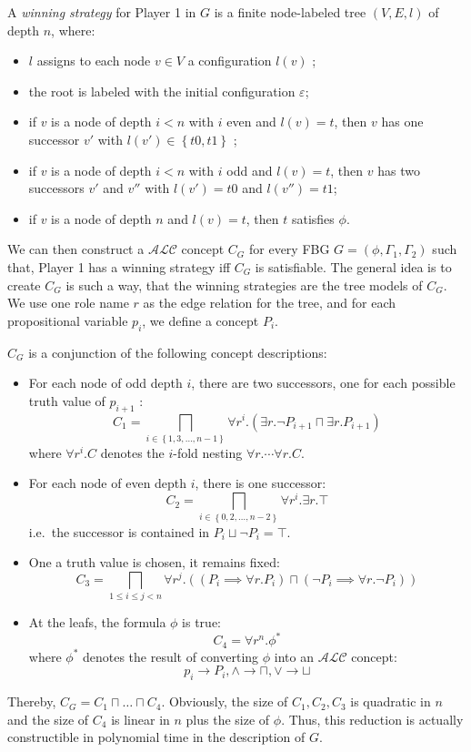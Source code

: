 A \textit{winning strategy} for Player 1 in $G$ is a finite node-labeled tree $\left( V, E ,l \right)$ of depth $n$, where:
 \begin{itemize}
	 \item $l$ assigns to each node $v \in V$ a configuration $l(v)$ ;
	 \item the root is labeled with the initial configuration $\varepsilon$;
	 \item if $v$ is a node of depth $i < n$ with $i$ even and $l(v) = t$,
		 then $v$ has one successor $v'$ with $l(v')  \in \left\{ t0, t1 \right\}$ ;
	 \item if $v$ is a node of depth $i < n$ with $i$ odd and $l(v) = t$,
		 then $v$ has two successors $v'$ and $v''$ with $l(v') = t0$ and $l(v'') = t1$;
	 \item if $v$ is a node of depth $n$ and $l(v) = t$, then $t$ satisfies $\phi$.
\end{itemize}

We can then construct a $\mathcal{ALC}$ concept $C_G$ for every FBG $G = \left( \phi, \Gamma_1, \Gamma_2 \right)$ such that,
Player 1 has a winning strategy iff $C_G$ is satisfiable.
The general idea is to create $C_G$ is such a way, that the winning strategies are the tree models of $C_G$.
We use one role name $r$ as the edge relation for the tree, and for each propositional variable $p_i$, we define a concept $P_i$.

$C_G$ is a conjunction of the following concept descriptions:
\begin{itemize}
	\item For each node of odd depth $i$, there are two successors, one for each possible truth value of $p_{i+1}$ :
		\[
			C_1 = \bigsqcap_{i \in \left\{ 1,3, \ldots, n-1 \right\}} \forall r^i.(\exists r. \neg P_{i+1} \sqcap \exists r.P_{i+1})
		\]
		where $\forall r^i.C$ denotes the $i$-fold nesting $\forall r. \cdots \forall r.C$.
	\item For each node of even depth $i$, there is one successor:
		\[
			C_2 = \bigsqcap_{i \in \left\{ 0, 2, \ldots, n-2 \right\}} \forall r^i.\exists r. \top
		\]
		i.e.\ the successor is contained in $P_i \sqcup \neg P_i = \top$.
	\item One a truth value is chosen, it remains fixed:
		\[
			C_3 = \bigsqcap_{1 \leq i \leq j <n} \forall r^j. \left( (P_i \implies \forall r.P_i) \sqcap (\neg P_i \implies \forall r. \neg P_i) \right)
		\]
	\item At the leafs, the formula $\phi$ is true:
		\[
			C_4 = \forall r^n. \phi^*
		\]
		where $\phi^*$ denotes the result of converting $\phi$ into an $\mathcal{ALC}$ concept:
		\[
			p_i \to P_i, \land \to \sqcap, \lor \to \sqcup
		\]
\end{itemize}
Thereby, $C_G = C_1 \sqcap \ldots \sqcap C_4$.
Obviously, the size of $C_1, C_2, C_3$ is quadratic in $n$ and the size of $C_4$ is linear in  $n$ plus the size of $\phi$.
Thus, this reduction is actually constructible in polynomial time in the description of $G$.

